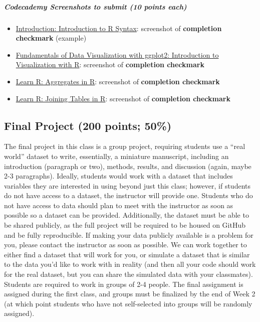 \documentclass[
  letterpaper,
  DIV=11,
  numbers=noendperiod]{scrartcl}
\let\oldsubparagraph\subparagraph
\renewcommand{\subparagraph}[1]{\oldsubparagraph{#1}\mbox{}}
\providecommand{\tightlist}{%
  \setlength{\itemsep}{0pt}\setlength{\parskip}{0pt}}\usepackage{longtable,booktabs,array}
\begin{document}
\hypertarget{codecademy-screenshots-to-submit-10-points-each}{%
\subparagraph{\texorpdfstring{\textbf{Codecademy Screenshots to submit
(10 points
each)}}{Codecademy Screenshots to submit (10 points each)}}\label{codecademy-screenshots-to-submit-10-points-each}}

\begin{itemize}
\tightlist
\item
  \href{https://www.codecademy.com/courses/learn-r/lessons/introduction-to-r/exercises/introduction}{Introduction:
  Introduction to R Syntax}: screenshot of \textbf{completion checkmark}
  (example)
\item
  \href{https://www.codecademy.com/courses/learn-r/lessons/intro-visualization-ggplot2-r/exercises/introduction}{Fundamentals
  of Data Visualization with ggplot2: Introduction to Visualization with
  R}: screenshot of \textbf{completion checkmark}
\item
  \href{https://www.codecademy.com/courses/learn-r/lessons/r-aggregates/exercises/introduction}{Learn
  R: Aggregates in R}: screenshot of \textbf{completion checkmark}
\item
  \href{https://www.codecademy.com/courses/learn-r/lessons/r-multiple-tables/exercises/introduction}{Learn
  R: Joining Tables in R}: screenshot of \textbf{completion checkmark}
\end{itemize}

\hypertarget{final-project-200-points-50}{%
\subsection{Final Project (200 points;
50\%)}\label{final-project-200-points-50}}

The final project in this class is a group project, requiring students
use a ``real world'' dataset to write, essentially, a miniature
manuscript, including an introduction (paragraph or two), methods,
results, and discussion (again, maybe 2-3 paragraphs). Ideally, students
would work with a dataset that includes variables they are interested in
using beyond just this class; however, if students do not have access to
a dataset, the instructor will provide one. Students who do not have
access to data should plan to meet with the instructor as soon as
possible so a dataset can be provided. Additionally, the dataset must be
able to be shared publicly, as the full project will be required to be
housed on GitHub and be fully reproducible. If making your data publicly
available is a problem for you, please contact the instructor as soon as
possible. We can work together to either find a dataset that will work
for you, or simulate a dataset that is similar to the data you'd like to
work with in reality (and then all your code should work for the real
dataset, but you can share the simulated data with your classmates).
Students are required to work in groups of 2-4 people. The final
assignment is assigned during the first class, and groups must be
finalized by the end of Week 2 (at which point students who have not
self-selected into groups will be randomly assigned).
\end{document}
